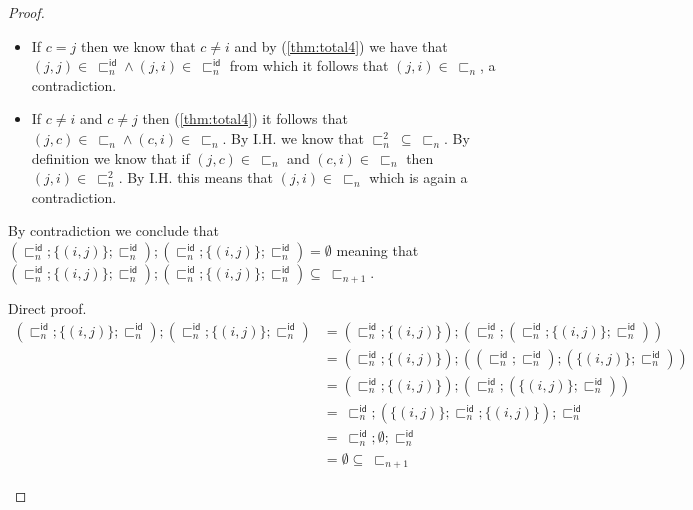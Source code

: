 \begin{lem}
{\begin{proof}
\begin{enumerate}[label=\alph*)]
\begin{itemize}
				\item If $c = j$ then we know that $c \neq i$ and by (\ref{thm:total4}) we have that $(j, j) \in\ \sqsubset_n^\mathsf{id} \land (j, i) \in\ \sqsubset_n^\mathsf{id}$ from which it follows that $(j, i) \in\ \sqsubset_n$, a contradiction.
				\item If $c \neq i$ and $c \neq j$ then (\ref{thm:total4}) it follows that $(j, c) \in\ \sqsubset_n \land (c, i) \in\ \sqsubset_n$. By I.H. we know that $\sqsubset_n^2\ \subseteq\ \sqsubset_n$. By definition we know that if $(j, c) \in\ \sqsubset_n$ and $(c, i) \in\ \sqsubset_n$ then $(j, i) \in\ \sqsubset_n^2$. By I.H. this means that $(j, i) \in\ \sqsubset_n$ which is again a contradiction.
			\end{itemize}
			By contradiction we conclude that $\left( \sqsubset_n^\mathsf{id} ; \{ (i, j) \} ; \sqsubset_n^\mathsf{id} \right) ; \left( \sqsubset_n^\mathsf{id} ; \{ (i, j) \} ; \sqsubset_n^\mathsf{id} \right) = \emptyset$ meaning that $\left( \sqsubset_n^\mathsf{id} ; \{ (i, j) \} ; \sqsubset_n^\mathsf{id} \right) ; \left( \sqsubset_n^\mathsf{id} ; \{ (i, j) \} ; \sqsubset_n^\mathsf{id} \right) \subseteq\ \sqsubset_{n + 1}$.
			
			Direct proof.
			\fi
			\begin{align*}
				\left( \sqsubset_n^\mathsf{id} ; \{ (i, j) \} ; \sqsubset_n^\mathsf{id} \right) ; \left( \sqsubset_n^\mathsf{id} ; \{ (i, j) \} ; \sqsubset_n^\mathsf{id} \right)
					&=
				\left( \sqsubset_n^\mathsf{id} ; \{ (i, j) \} \right) ; \left( \sqsubset_n^\mathsf{id} ; \left( \sqsubset_n^\mathsf{id} ; \{ (i, j) \} ; \sqsubset_n^\mathsf{id} \right) \right) \\
					&=
				\left( \sqsubset_n^\mathsf{id} ; \{ (i, j) \} \right) ; \left( \left( \sqsubset_n^\mathsf{id} ;  \sqsubset_n^\mathsf{id} \right) ; \left( \{ (i, j) \} ; \sqsubset_n^\mathsf{id} \right) \right) \\
					&=
				\left( \sqsubset_n^\mathsf{id} ; \{ (i, j) \} \right) ; \left( \sqsubset_n^\mathsf{id} ; \left( \{ (i, j) \} ; \sqsubset_n^\mathsf{id} \right) \right) \\
					&=\
				\sqsubset_n^\mathsf{id} ; \left( \{ (i, j) \} ; \sqsubset_n^\mathsf{id} ; \{ (i, j) \} \right) ; \sqsubset_n^\mathsf{id} \\
					&=\
				\sqsubset_n^\mathsf{id} ; \emptyset ; \sqsubset_n^\mathsf{id} \\
					&= \emptyset \subseteq\ \sqsubset_{n+1}
			\end{align*}
	\end{enumerate}
	\end{proof}
	}
\end{lem}